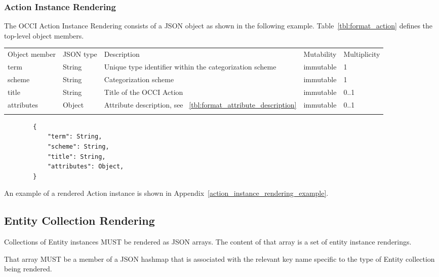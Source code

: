 \documentclass[10pt,a4paper]{article}
\begin{document}
\subsubsection{Action Instance Rendering}
\label{sec:format_action}

The OCCI Action Instance Rendering consists of a JSON object as shown in the
following example.
Table~\ref{tbl:format_action} defines the top-level object members.

 {
    \begin{tabularx}{\textwidth}{llXll}
    \toprule
    Object member & JSON type & Description & Mutability & Multiplicity \\
    \colrule
    term & String & Unique type identifier within the categorization scheme &
immutable & 1 \\

    scheme & String & Categorization scheme & immutable & 1 \\

    title & String & Title of the OCCI Action & immutable & 0..1 \\

    attributes & Object & Attribute description, see
~\ref{tbl:format_attribute_description} & immutable & 0..1 \\
    \botrule
    \end{tabularx}
}

\begin{lstlisting}
        {
            "term": String,
            "scheme": String,
            "title": String,
            "attributes": Object,
        }
\end{lstlisting}

An example of a rendered Action instance is shown in Appendix~\ref{action_instance_rendering_example}.



\subsection{Entity Collection Rendering}
Collections of Entity instances MUST be rendered as JSON arrays. The content of that array is a set of entity instance renderings.

That array MUST be a member of a JSON hashmap that is associated with the relevant key name specific to the type of Entity collection being rendered.
\end{document}
